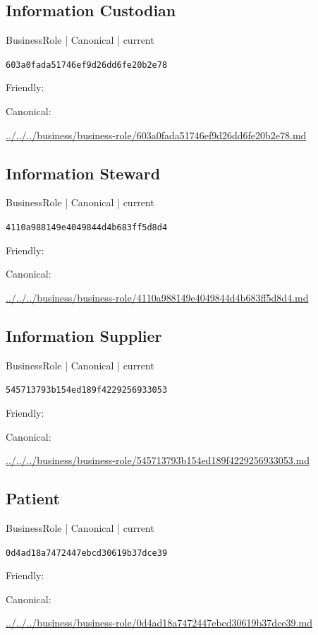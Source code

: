 \documentclass[10pt,a4paper]{article}
\begin{document}
\subsection*{Information Custodian}
{\small BusinessRole | Canonical | current}\par
\texttt{603a0fada51746ef9d26dd6fe20b2e78}\par
Friendly: \par
Canonical: \par
{\footnotesize\url{../../../business/business-role/603a0fada51746ef9d26dd6fe20b2e78.md}}\par
\subsection*{Information Steward}
{\small BusinessRole | Canonical | current}\par
\texttt{4110a988149e4049844d4b683ff5d8d4}\par
Friendly: \par
Canonical: \par
{\footnotesize\url{../../../business/business-role/4110a988149e4049844d4b683ff5d8d4.md}}\par
\subsection*{Information Supplier}
{\small BusinessRole | Canonical | current}\par
\texttt{545713793b154ed189f4229256933053}\par
Friendly: \par
Canonical: \par
{\footnotesize\url{../../../business/business-role/545713793b154ed189f4229256933053.md}}\par
\subsection*{Patient}
{\small BusinessRole | Canonical | current}\par
\texttt{0d4ad18a7472447ebcd30619b37dce39}\par
Friendly: \par
Canonical: \par
{\footnotesize\url{../../../business/business-role/0d4ad18a7472447ebcd30619b37dce39.md}}\par
\end{document}
